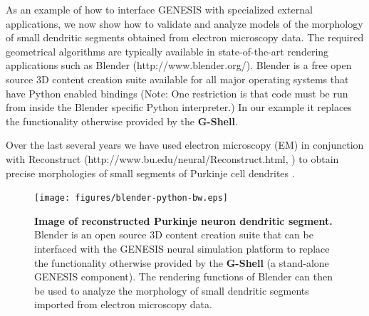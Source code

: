 \documentclass[10pt]{article}
\begin{document}
As an example of how to interface GENESIS with specialized external
applications, we now show how to validate and analyze models of the
morphology of small dendritic segments obtained from electron
microscopy data.  The required geometrical algorithms are typically
available in state-of-the-art rendering applications such as  Blender
(http://www.blender.org/). Blender is a free open source 3D content creation
suite available for all major operating systems that have Python
enabled bindings (Note: One restriction is that code must be run
  from inside the Blender specific Python interpreter.) In our
example it replaces the functionality otherwise provided by the
{\bf G-Shell}.

Over the last several years we have used electron microscopy (EM) in conjunction
with Reconstruct (http://www.bu.edu/neural/Reconstruct.html, \cite{jc05:_recon}) to obtain precise
morphologies of small segments of Purkinje cell
dendrites \cite{huo09:_purkin, cornelis08:_model_neuros_genes}.


\begin{figure}[ht]
  \begin{center}
    \texttt{[image: figures/blender-python-bw.eps]}
  \end{center}
  \caption{ {\bf Image of reconstructed Purkinje neuron dendritic
      segment.} Blender is an open source 3D content creation suite
    that can be interfaced with the GENESIS neural simulation platform
    to replace the functionality otherwise provided by the {\bf
      G-Shell} (a stand-alone GENESIS component). The rendering
    functions of Blender can then be used to analyze the morphology of
    small dendritic segments imported from electron microscopy data.
  }
  \label{fig:cbi-blender}
\end{figure}
\end{document}

